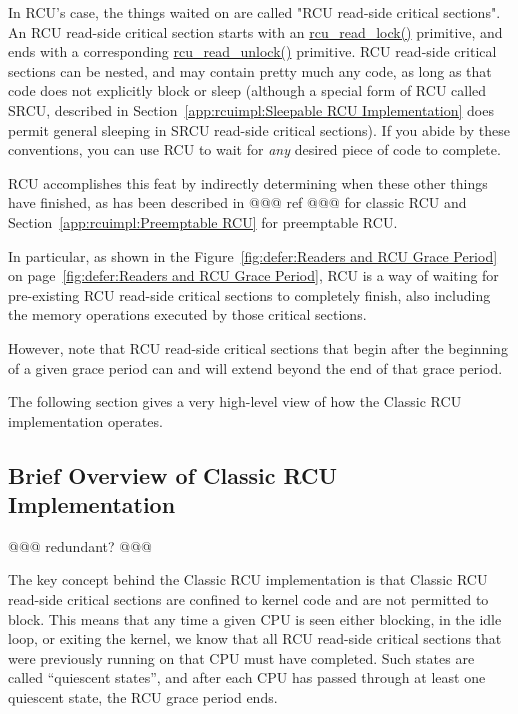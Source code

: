 In RCU's case, the things waited on are called
"RCU read-side critical sections".
An RCU read-side critical section starts with an
\url{rcu_read_lock()} primitive, and ends with a corresponding
\url{rcu_read_unlock()} primitive.
RCU read-side critical sections can be nested, and may contain pretty
much any code, as long as that code does not explicitly block or sleep
(although a special form of RCU called SRCU, described in
Section~\ref{app:rcuimpl:Sleepable RCU Implementation}
does permit general sleeping in SRCU read-side critical sections).
If you abide by these conventions, you can use RCU to wait for \emph{any}
desired piece of code to complete.

RCU accomplishes this feat by indirectly determining when these
other things have finished, as has been described in
@@@ ref @@@
for classic RCU and
Section~\ref{app:rcuimpl:Preemptable RCU} for preemptable RCU.

In particular, as shown in the
Figure~\ref{fig:defer:Readers and RCU Grace Period} on
page~\ref{fig:defer:Readers and RCU Grace Period},
RCU is a way of
waiting for pre-existing RCU read-side critical sections to completely
finish, also including the memory operations executed
by those critical sections.

However, note that RCU read-side critical sections
that begin after the beginning
of a given grace period can and will extend beyond the end of that grace
period.

The following section gives a very high-level view of how
the Classic RCU implementation operates.

\subsection{Brief Overview of Classic RCU Implementation}
\label{app:rcuimpl:rcutree:Brief Overview of Classic RCU Implementation}

@@@ redundant? @@@

The key concept behind the Classic RCU implementation is that
Classic RCU read-side critical sections are confined to kernel
code and are not permitted to block.
This means that any time a given CPU is seen
either blocking, in the idle loop, or exiting the kernel, we know that all
RCU read-side critical sections that were previously running on
that CPU must have completed.
Such states are called ``quiescent states'', and
after each CPU has passed through at least one quiescent state,
the RCU grace period ends.

